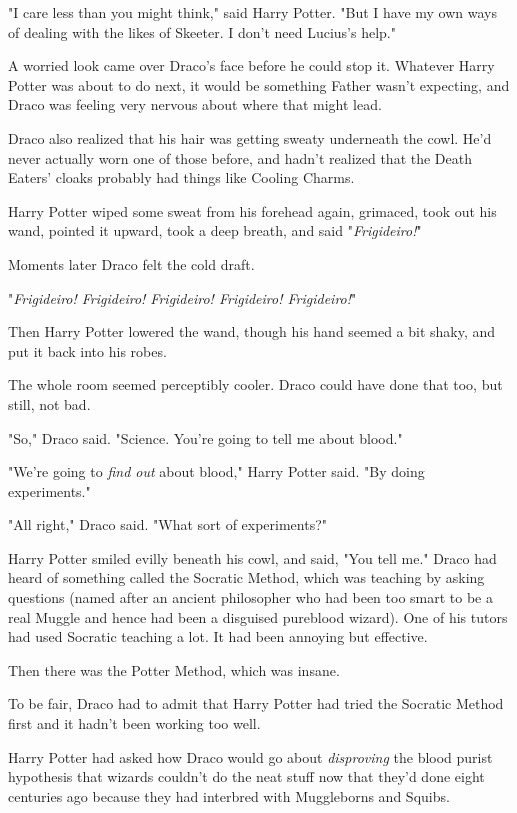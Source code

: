"I care less than you might think," said Harry Potter. "But I have my own ways
of dealing with the likes of Skeeter. I don't need Lucius's help."

A worried look came over Draco's face before he could stop it. Whatever Harry
Potter was about to do next, it would be something Father wasn't expecting, and
Draco was feeling very nervous about where that might lead.

Draco also realized that his hair was getting sweaty underneath the cowl. He'd
never actually worn one of those before, and hadn't realized that the Death
Eaters' cloaks probably had things like Cooling Charms.

Harry Potter wiped some sweat from his forehead again, grimaced, took out his
wand, pointed it upward, took a deep breath, and said "\emph{Frigideiro!}"

Moments later Draco felt the cold draft.

"\emph{Frigideiro! Frigideiro! Frigideiro! Frigideiro! Frigideiro!}"

Then Harry Potter lowered the wand, though his hand seemed a bit shaky, and put
it back into his robes.

The whole room seemed perceptibly cooler. Draco could have done that too, but
still, not bad.

"So," Draco said. "Science. You're going to tell me about blood."

"We're going to \emph{find out} about blood," Harry Potter said. "By doing
experiments."

"All right," Draco said. "What sort of experiments?"

Harry Potter smiled evilly beneath his cowl, and said, "You tell me."
\sbreak
Draco had heard of something called the Socratic Method, which was teaching by
asking questions (named after an ancient philosopher who had been too smart to
be a real Muggle and hence had been a disguised pureblood wizard). One of his
tutors had used Socratic teaching a lot. It had been annoying but effective.

Then there was the Potter Method, which was insane.

To be fair, Draco had to admit that Harry Potter had tried the Socratic Method
first and it hadn't been working too well.

Harry Potter had asked how Draco would go about \emph{disproving} the blood
purist hypothesis that wizards couldn't do the neat stuff now that they'd done
eight centuries ago because they had interbred with Muggleborns and Squibs.

